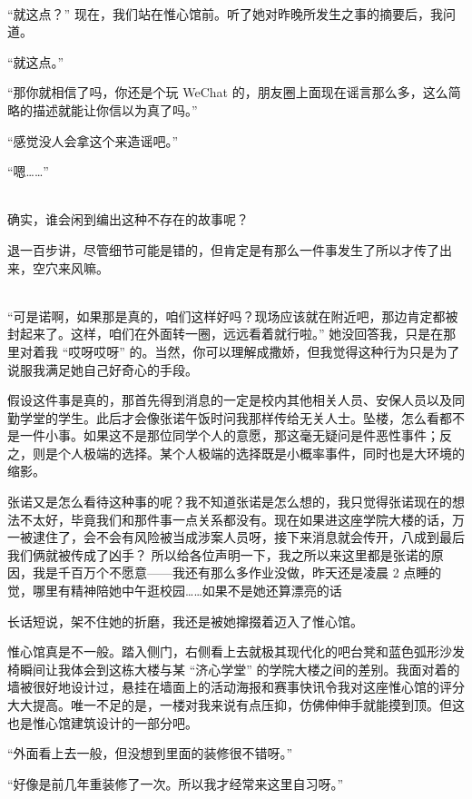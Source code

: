 \documentclass[UTF8]{ctexart}
\begin{document}
~\\

“就这点？” 现在，我们站在惟心馆前。听了她对昨晚所发生之事的摘要后，我问道。

“就这点。”

“那你就相信了吗，你还是个玩 WeChat 的，朋友圈上面现在谣言那么多，这么简略的描述就能让你信以为真了吗。”

“感觉没人会拿这个来造谣吧。”

“嗯……”

~\\

确实，谁会闲到编出这种不存在的故事呢？

退一百步讲，尽管细节可能是错的，但肯定是有那么一件事发生了所以才传了出来，空穴来风嘛。


~\\

“可是诺啊，如果那是真的，咱们这样好吗？现场应该就在附近吧，那边肯定都被封起来了。这样，咱们在外面转一圈，远远看着就行啦。” 她没回答我，只是在那里对着我 “哎呀哎呀” 的。当然，你可以理解成撒娇，但我觉得这种行为只是为了说服我满足她自己好奇心的手段。

假设这件事是真的，那首先得到消息的一定是校内其他相关人员、安保人员以及同勤学堂的学生。此后才会像张诺午饭时问我那样传给无关人士。坠楼，怎么看都不是一件小事。如果这不是那位同学个人的意愿，那这毫无疑问是件恶性事件；反之，则是个人极端的选择。某个人极端的选择既是小概率事件，同时也是大环境的缩影。

张诺又是怎么看待这种事的呢？我不知道张诺是怎么想的，我只觉得张诺现在的想法不太好，毕竟我们和那件事一点关系都没有。现在如果进这座学院大楼的话，万一被逮住了，会不会有风险被当成涉案人员呀，接下来消息就会传开，八成到最后我们俩就被传成了凶手？
所以给各位声明一下，我之所以来这里都是张诺的原因，我是千百万个不愿意——我还有那么多作业没做，昨天还是凌晨 2 点睡的觉，哪里有精神陪她中午逛校园……如果不是她还算漂亮的话

长话短说，架不住她的折磨，我还是被她撺掇着迈入了惟心馆。

惟心馆真是不一般。踏入侧门，右侧看上去就极其现代化的吧台凳和蓝色弧形沙发椅瞬间让我体会到这栋大楼与某 “济心学堂” 的学院大楼之间的差别。我面对着的墙被很好地设计过，悬挂在墙面上的活动海报和赛事快讯令我对这座惟心馆的评分大大提高。唯一不足的是，一楼对我来说有点压抑，仿佛伸伸手就能摸到顶。但这也是惟心馆建筑设计的一部分吧。

“外面看上去一般，但没想到里面的装修很不错呀。”

“好像是前几年重装修了一次。所以我才经常来这里自习呀。”
\end{document}
